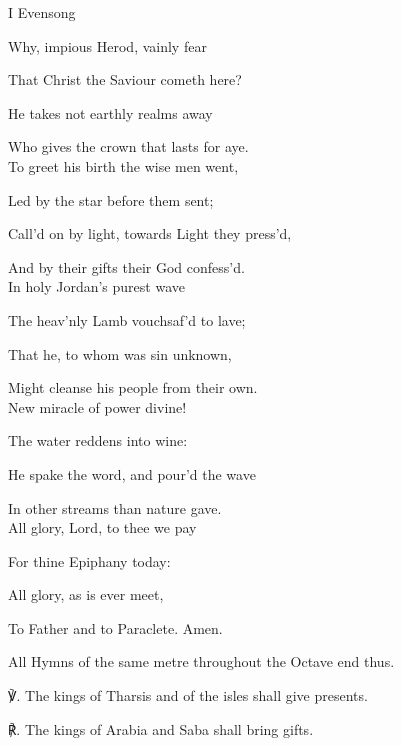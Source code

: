 \begin{paracol}{2}[]
\sloppy
\begin{inhead}
	I Evensong
\end{inhead}
\begin{hangparas}{1.25em}{1}
Why, impious Herod, vainly fear

That Christ the Saviour cometh here?

He takes not earthly realms away

Who gives the crown that lasts for aye.\\

To greet his birth the wise men went,

Led by the star before them sent;

Call'd on by light, towards Light they press'd,

And by their gifts their God confess'd.\\

In holy Jordan's purest wave

The heav'nly Lamb vouchsaf'd to lave;

That he, to whom was sin unknown,

Might cleanse his people from their own.\\

New miracle of power divine!

The water reddens into wine:

He spake the word, and pour'd the wave

In other streams than nature gave.\\

All glory, Lord, to thee we pay

For thine Epiphany today:

All glory, as is ever meet,

To Father and to Paraclete. Amen.
\end{hangparas}

\begin{rubric}
	All Hymns of the same metre throughout the Octave end thus.
\end{rubric}

℣. The kings of Tharsis and of the isles shall give presents.

℟. The kings of Arabia and Saba shall bring gifts.



\end{paracol}
